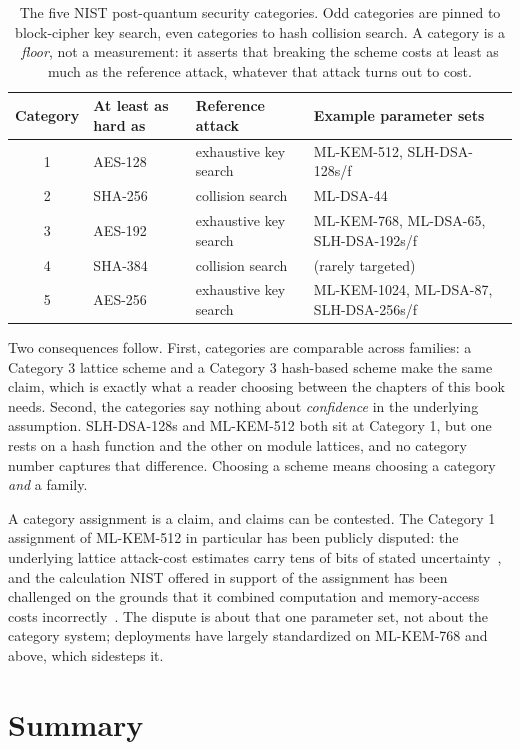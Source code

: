 \begin{table}[H]
\centering
\small
\begin{tabular}{@{}cllp{4.6cm}@{}}
\toprule
Category & At least as hard as & Reference attack & Example parameter sets \\
\midrule
1 & AES-128 & exhaustive key search & ML-KEM-512, SLH-DSA-128s/f \\
2 & SHA-256 & collision search      & ML-DSA-44 \\
3 & AES-192 & exhaustive key search & ML-KEM-768, ML-DSA-65, SLH-DSA-192s/f \\
4 & SHA-384 & collision search      & (rarely targeted) \\
5 & AES-256 & exhaustive key search & ML-KEM-1024, ML-DSA-87, SLH-DSA-256s/f \\
\bottomrule
\end{tabular}
\caption{The five NIST post-quantum security categories. Odd categories are
pinned to block-cipher key search, even categories to hash collision search. A
category is a \emph{floor}, not a measurement: it asserts that breaking the
scheme costs at least as much as the reference attack, whatever that attack turns
out to cost.}
\label{tab:nist-categories}
\end{table}

Two consequences follow. First, categories are comparable across families: a
Category 3 lattice scheme and a Category 3 hash-based scheme make the same claim,
which is exactly what a reader choosing between the chapters of this book needs.
Second, the categories say nothing about \emph{confidence} in the underlying
assumption. SLH-DSA-128s and ML-KEM-512 both sit at Category 1, but one rests on
a hash function and the other on module lattices, and no category number captures
that difference. Choosing a scheme means choosing a category \emph{and} a family.

A category assignment is a claim, and claims can be contested. The Category 1
assignment of ML-KEM-512 in particular has been publicly disputed: the
underlying lattice attack-cost estimates carry tens of bits of stated
uncertainty~\cite{matzov2022}, and the calculation NIST offered in support of
the assignment has been challenged on the grounds that it combined computation
and memory-access costs incorrectly~\cite{bernstein2023kyber}. The dispute is
about that one parameter set, not about the category system; deployments have
largely standardized on ML-KEM-768 and above, which sidesteps it.

\section{Summary}


